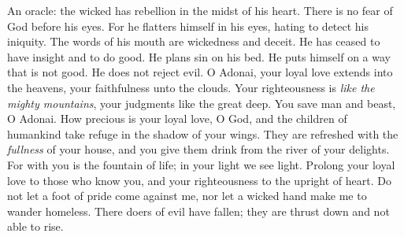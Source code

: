\begin{biblechapter} %
 An oracle: the wicked has rebellion 
in the midst of his heart. 
There is no fear of God before his eyes.
\verse For he flatters himself in his eyes, 
hating to detect his iniquity.
\verse The words of his mouth are wickedness and deceit. 
He has ceased to have insight and to do good.
\verse He plans sin on his bed. 
He puts himself on a way that is not good. 
He does not reject evil.
\verse O Adonai, your loyal love extends into the heavens, 
your faithfulness unto the clouds.
\verse Your righteousness is \textit{like the mighty mountains}, 
your judgments like the great deep. 
You save man and beast, O Adonai.
\verse How precious is your loyal love, O God, 
and the children of humankind 
take refuge in the shadow of your wings.
\verse They are refreshed with the \textit{fullness} of your house, 
and you give them drink from the river of your delights.
\verse For with you is the fountain of life; 
in your light we see light.
\verse Prolong your loyal love to those who know you, 
and your righteousness to the upright of heart.
\verse Do not let a foot of pride come against me, 
nor let a wicked hand make me to wander homeless.
\verse There doers of evil have fallen; 
they are thrust down and not able to rise.
\end{biblechapter}

